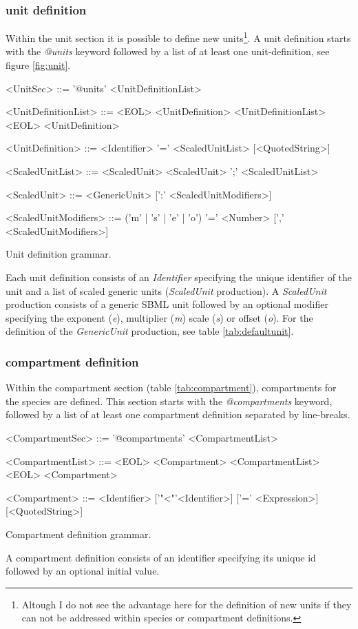 \documentclass[a4paper]{article}
\begin{document}
\subsubsection*{unit definition}
Within the unit section it is possible to define new units\footnote{Altough I do not see the advantage here for the definition of new units if they can not be addressed within species or compartment definitions.}. A unit definition starts with the \emph{@units} keyword followed by a list of at least one unit-definition, see figure \ref{fig:unit}. 

\begin{table}[h!]
\begin{grammar}
<UnitSec> ::= '@units' <UnitDefinitionList>

<UnitDefinitionList> ::= <EOL> <UnitDefinition> <UnitDefinitionList>
  \alt <EOL> <UnitDefinition>
  
<UnitDefinition> ::= <Identifier> '=' <ScaledUnitList> [<QuotedString>]

<ScaledUnitList> ::= <ScaledUnit>
  \alt <ScaledUnit> ';' <ScaledUnitList>

<ScaledUnit> ::= <GenericUnit> [':' <ScaledUnitModifiers>]

<ScaledUnitModifiers> ::= ('m' | 's' | 'e' | 'o') '=' <Number> [',' <ScaledUnitModifiers>]
\end{grammar}
\caption{Unit definition grammar.} \label{fig:unit}
\end{table}
Each unit definition consists of an \emph{Identifier} specifying the unique identifier of the unit and a list of scaled generic units (\emph{ScaledUnit} production). A \emph{ScaledUnit} production consists of a generic SBML unit followed by an optional modifier specifying the exponent (\emph{e}), multiplier (\emph{m}) scale (\emph{s}) or offset (\emph{o}). For the definition of the \emph{GenericUnit} production, see table \ref{tab:defaultunit}.


\subsubsection*{compartment definition}
Within the compartment section (table \ref{tab:compartment}), compartments for the species are defined. This section starts with the \emph{@compartments} keyword, followed by a list of at least one compartment definition separated by line-breaks.

\begin{table}[h!]
\begin{grammar}
<CompartmentSec> ::= '@compartments' <CompartmentList>

<CompartmentList> ::= <EOL> <Compartment> <CompartmentList>
  \alt <EOL> <Compartment> 
  
<Compartment> ::= <Identifier> ['"<"'<Identifier>] ['=' <Expression>] [<QuotedString>]
\end{grammar}
\caption{Compartment definition grammar.} \label{tab:compartment}
\end{table}
A compartment definition consists of an identifier specifying its unique id followed by an optional initial value.
\end{document}
